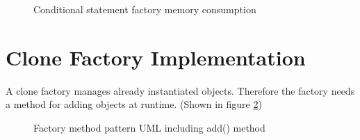 {\FloatBarrier

\begin{figure}[h]{}
\centering
\mbox{}
\caption{Conditional statement factory memory consumption}
\label{fig:conditionalStatementFactoryMemoryConsumption}
\end{figure}
 
\FloatBarrier

\section{Clone Factory Implementation}\label{sec:cloneFactory}
A clone factory manages already instantiated objects. Therefore the factory needs a method for adding objects at runtime. (Shown in figure \ref{fig:factoryPatternClone})

\begin{figure}[h]{}
\centering
\mbox{}
\caption{Factory method pattern UML including add() method}
\label{fig:factoryPatternClone}
\end{figure}

}
